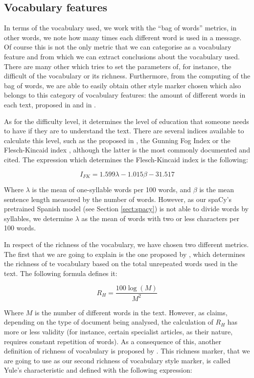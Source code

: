 \subsection{Vocabulary features}\label{ssect:vocabf}

In terms of the vocabulary used, we work with the ``bag of words'' metrics, in other words, we note how many times each different word is used in a message. Of course this is not the only metric that we can categorise as a vocabulary feature and from which we can extract conclusions about the vocabulary used. There are many other which tries to set the parameters of, for instance, the difficult of the vocabulary or its richness. Furthermore, from the computing of the bag of words, we are able to easily obtain other style marker chosen which also belongs to this category of vocabulary features: the amount of different words in each text, proposed in \cite{ril2014determination} and in \cite{corney2001identifying}.

As for the difficulty level, it determines the level of education that someone needs to have if they are to understand the text. There are several indices available to calculate this level, such as the proposed in \cite{dale1948formula}, the Gunning Fog Index \citep{wiki:gunning} or the Flesch-Kincaid index \citep{dubay2004principles}, although the latter is the most commonly documented and cited. The expression which determines the Flesch-Kincaid index is the following:

$$
I_{FK} = 1.599\lambda-1.015\beta-31.517
$$

Where $\lambda$ is the mean of one-syllable words per 100 words, and $\beta$ is the mean sentence length measured by the number of words. However, as our spaCy's pretrained Spanish model (see Section \ref{sect:spacy}) is not able to divide words by syllables, we determine $\lambda$ as the mean of words with two or less characters per 100 words.

In respect of the richness of the vocabulary, we have chosen two different metrics. The first that we are going to explain is the one proposed by \cite{honore1979some}, which determines the richness of te vocabulary based on the total unrepeated words used in the text. The following formula defines it:

$$
R_H = \frac{100\log(M)}{M^2}
$$

Where $M$ is the number of different words in the text. However, as \cite{ril2014determination} claims, depending on the type of document being analysed, the calculation of $R_H$ has more or less validity (for instance, certain specialist articles, as their nature, requires constant repetition of words). As a consequence of this, another definition of richness of vocabulary is proposed by \cite{yule2014statistical}. This richness marker, that we are going to use as our second richness of vocabulary style marker, is called Yule's characteristic and defined with the following expression:

